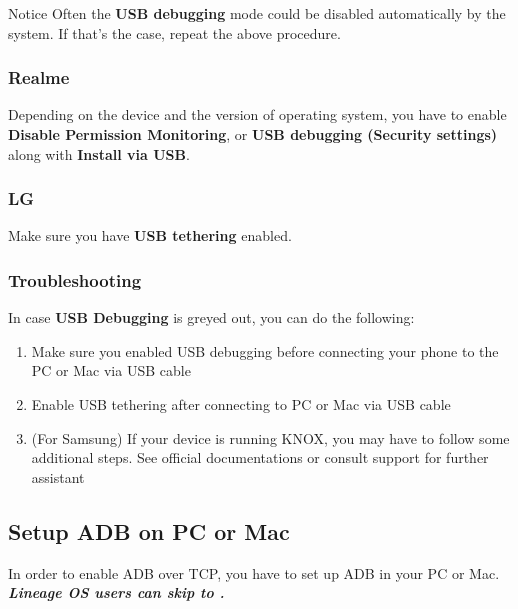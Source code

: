 \begin{tip}{Notice}
    Often the \textbf{USB debugging} mode could be disabled automatically by the system. If that's the case, repeat the
    above procedure.
\end{tip}

\subsubsection{Realme} %
Depending on the device and the version of operating system, you have to enable \textbf{Disable Permission Monitoring},
or \textbf{USB debugging (Security settings)} along with \textbf{Install via USB}.

\subsubsection{LG} %
Make sure you have \textbf{USB tethering} enabled.

\subsubsection{Troubleshooting} %
In case \textbf{USB Debugging} is greyed out, you can do the following:
\begin{enumerate}
    \item Make sure you enabled USB debugging before connecting your phone to the PC or Mac via USB cable
    \item Enable USB tethering after connecting to PC or Mac via USB cable
    \item (For Samsung) If your device is running KNOX, you may have to follow some additional steps. See official
    documentations or consult support for further assistant
\end{enumerate}

\subsection{Setup ADB on PC or Mac}\label{subsec:setup-adb-on-pc-or-mac} %
In order to enable ADB over TCP, you have to set up ADB in your PC or Mac. \textbf{\textit{Lineage OS users can skip to
.}}

